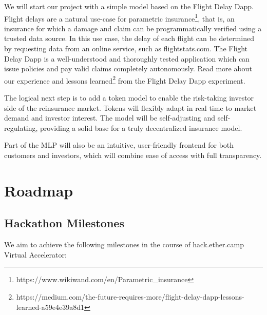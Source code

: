 \documentclass[12pt]{article}
\begin{document}
We will start our project with a simple model based on the Flight Delay Dapp. Flight delays are a natural use-case for parametric insurance\footnote{https://www.wikiwand.com/en/Parametric\_insurance}, that is, an insurance for which a damage and claim can be programmatically verified using a trusted data source. In this use case, the delay of each flight can be determined by requesting data from an online service, such as flightstats.com. The Flight Delay Dapp is a well-understood and thoroughly tested application which can issue policies and pay valid claims completely autonomously. Read more about our experience and lessons learned\footnote{https://medium.com/the-future-requires-more/flight-delay-dapp-lessons-learned-a59e4e39a8d1} from the Flight Delay Dapp experiment.

The logical next step is to add a token model to enable the risk-taking investor side of the reinsurance market. Tokens will flexibly adapt in real time to market demand and investor interest. The model will be self-adjusting and self-regulating, providing a solid base for a truly decentralized insurance model.

Part of the MLP will also be an intuitive, user-friendly frontend for both customers and investors, which will combine ease of access with full transparency.


\section{Roadmap}

\subsection{Hackathon Milestones}

We aim to achieve the following milestones in the course of hack.ether.camp Virtual Accelerator:

\vspace{10mm}
\end{document}
